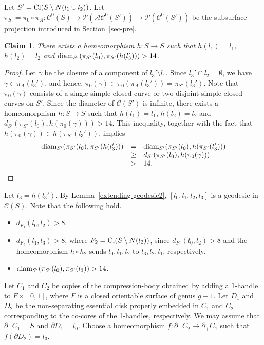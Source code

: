 \documentclass[]{aspm}
\newtheorem{claim}[definition]{Claim}
\begin{document}
Let $S'={\rm Cl}(S\setminus N(l_1\cup l_2))$.
Let $\pi_{S'}=\pi_0\circ \pi_A:\mathcal{C}^0(S)\rightarrow \mathcal{P}(\mathcal{AC}^0(S'))\rightarrow \mathcal{P}(\mathcal{C}^0(S'))$ be the subsurface projection introduced in Section~\ref{sec-pre}.

\begin{claim}\label{claim-s'}
There exists a homeomorphism $h:S\rightarrow S$ such that $h(l_1)=l_1$, $h(l_2)=l_2$ and 
${\rm diam}_{S'}(\pi_{S'}(l_0), \pi_{S'}(h(l_3')))>14$.
\end{claim}

\begin{proof}
Let $\gamma$ be the closure of a component of $l_3'\setminus l_1$.
Since $l_3'\cap l_2=\emptyset$, we have $\gamma\in\pi_{A}(l_3')$, and hence, $\pi_0(\gamma)\in\pi_0(\pi_{A}(l_3'))=\pi_{S'}(l_3')$.
Note that $\pi_0(\gamma)$ consists of a single simple closed curve or two disjoint simple closed curves on $S'$.
Since the diameter of $\mathcal{C}(S')$ is infinite, there exists a homeomorphism $h:S\rightarrow S$ such that $h(l_1)=l_1$, $h(l_2)=l_2$ and 
$d_{S'}(\pi_{S'}(l_0), h(\pi_0(\gamma)))>14$.
This inequality, together with the fact that $h(\pi_0(\gamma))\in h(\pi_{S'}(l_3'))$, implies 
\begin{eqnarray*}
\begin{array}{rcl}
{\rm diam}_{S'}(\pi_{S'}(l_0), \pi_{S'}(h(l_3')))&=&{\rm diam}_{S'}(\pi_{S'}(l_0), h(\pi_{S'}(l_3')))\\
&\geq &d_{S'}(\pi_{S'}(l_0), h(\pi_0(\gamma)))\\
&>&14.
\end{array}
\end{eqnarray*}
\end{proof}


Let $l_3=h(l_3')$.
By Lemma~\ref{extending geodesic2}, $[l_0,l_1,l_2,l_3]$ is a geodesic in $\mathcal{C}(S)$.
Note that the following hold.
\begin{itemize}
\item $d_{F_1}(l_0,l_2)>8$.
\item $d_{F_2}(l_1,l_3)>8$, where $F_2={\rm Cl}(S\setminus N(l_2))$, since $d_{F_1}(l_0,l_2)>8$ and the homeomorphism $h\circ h_2$ sends $l_0,l_1,l_2$ to $l_3,l_2,l_1$, respectively.
\item ${\rm diam}_{S'}(\pi_{S'}(l_0), \pi_{S'}(l_3))>14$.
\end{itemize}

Let $C_1$ and $C_2$ be copies of the compression-body obtained by adding a $1$-handle to $F\times [0,1]$, where $F$ is a closed orientable surface of genus $g-1$.
Let $D_1$ and $D_2$ be the non-separating essential disk properly embedded in $C_1$ and $C_2$ corresponding to the co-cores of the 1-handles, respectively.
We may assume that $\partial_+C_1=S$ and $\partial D_1=l_0$.
Choose a homeomorphism $f:\partial_+C_2\rightarrow \partial_+C_1$ such that $f(\partial D_2)=l_3$.
\end{document}
